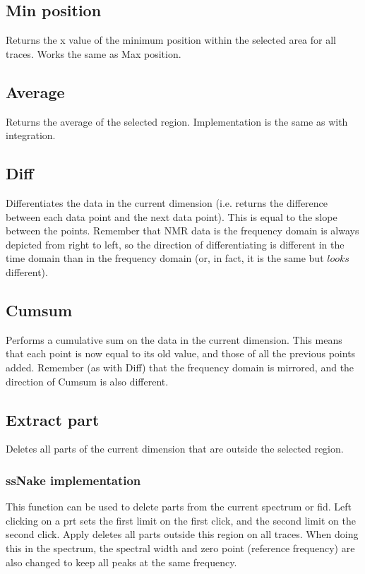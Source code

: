 \documentclass[11pt,a4paper]{article}
\begin{document}
\subsection{Min position}
Returns the x value of the minimum position within the selected area for all traces. Works the same as Max position.

\subsection{Average}
Returns the average of the selected region. Implementation is the same as with integration.

\subsection{Diff}
Differentiates the data in the current dimension (i.e. returns the difference between each data point and the next data point). This is equal to the slope between the points. Remember that NMR data is the frequency domain is always depicted from right to left, so the direction of differentiating is different in the time domain than in the frequency domain (or, in fact, it is the same but $looks$ different).

\subsection{Cumsum}
Performs a cumulative sum on the data in the current dimension. This means that each point is now equal to its old value, and those of all the previous points added. Remember (as with Diff) that the frequency domain is mirrored, and the direction of Cumsum is also different.


\subsection{Extract part}
Deletes all parts of the current dimension that are outside the selected region.


\subsubsection*{ssNake implementation}
This function can be used to delete parts from the current spectrum or fid. Left clicking on a prt sets the first limit on the first click, and the second limit on the second click. Apply deletes all parts outside this region on all traces. When doing this in the spectrum, the spectral width and zero point (reference frequency) are also changed to keep all peaks at the same frequency.
\end{document}
